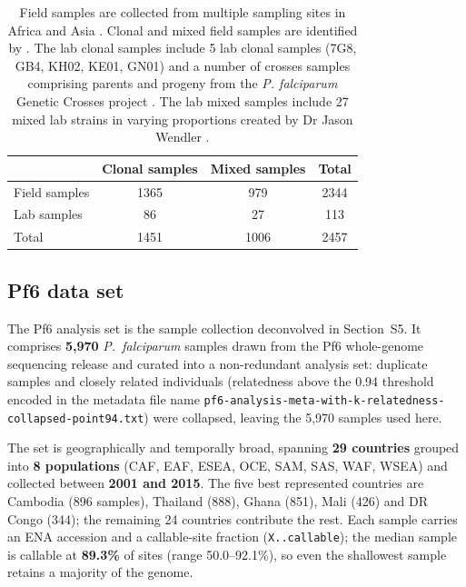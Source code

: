 \documentclass{article}
\begin{document}
\begin{table}[h]
    \centering
    \begin{tabular}{lccc}\hline\hline
                  &  Clonal samples  & Mixed samples & Total \\ \hline
    Field samples &  1365  & 979 & 2344\\
    Lab samples &  86  & 27 & 113\\
    Total &  1451 & 1006 & 2457\\
    \hline\hline
    \end{tabular}
    \caption{Field samples are collected from multiple sampling sites in Africa and Asia \citep{Duffy2015, Kamau2015, eLife2016, Mobegi2014, Amato2017, Miotto2013, Ocholla2014, Amambua-Ngwa2012, Wong2017}. Clonal and mixed field samples are identified by \citet{Zhu2019}. The lab clonal samples include 5 lab clonal samples (7G8, GB4, KH02, KE01, GN01) and a number of crosses samples comprising parents and progeny from the {\it P. falciparum} Genetic Crosses project \citep{Miles2016}. The lab mixed samples include 27 mixed lab strains in varying proportions created by Dr Jason Wendler \citep{Wendler2015}. } %
    \label{tab:pf3k}
\end{table}




\subsection{Pf6 data set}
\label{sec:pf6}

The Pf6 analysis set is the sample collection deconvolved in Section~S5. It
comprises \textbf{5,970} \emph{P.\ falciparum} samples drawn from the Pf6
whole-genome sequencing release and curated into a non-redundant analysis
set: duplicate samples and closely related individuals (relatedness above
the 0.94 threshold encoded in the metadata file name
\texttt{pf6-analysis-meta-with-k-relatedness-collapsed-point94.txt}) were
collapsed, leaving the 5,970 samples used here.

The set is geographically and temporally broad, spanning \textbf{29
countries} grouped into \textbf{8 populations} (CAF, EAF, ESEA, OCE, SAM,
SAS, WAF, WSEA) and collected between \textbf{2001 and 2015}. The five best
represented countries are Cambodia (896 samples), Thailand (888), Ghana
(851), Mali (426) and DR Congo (344); the remaining 24 countries contribute
the rest. Each sample carries an ENA accession and a callable-site fraction
(\texttt{X..callable}); the median sample is callable at \textbf{89.3\%} of
sites (range 50.0--92.1\%), so even the shallowest sample retains a majority
of the genome.
\end{document}
